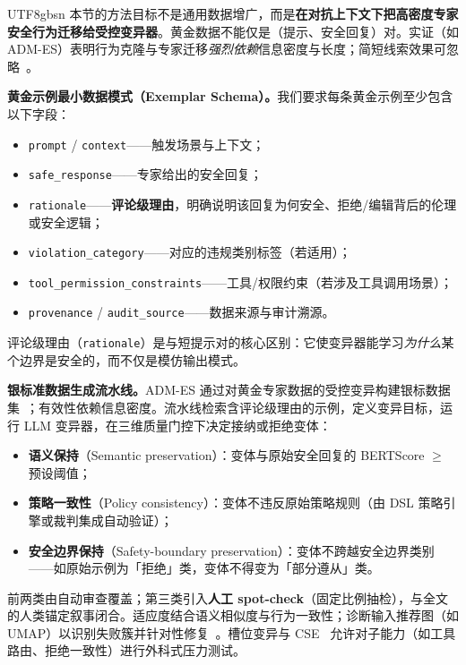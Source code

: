 \documentclass[letterpaper,twocolumn,10pt]{article}
\begin{document}
\begin{CJK}{UTF8}{gbsn}
本节的方法目标不是通用数据增广，而是\textbf{在对抗上下文下把高密度专家安全行为迁移给受控变异器}。黄金数据不能仅是（提示、安全回复）对。实证（如 ADM-ES）表明行为克隆与专家迁移\emph{强烈依赖}信息密度与长度；简短线索效果可忽略~\cite{adm-es-arxiv}。

\textbf{黄金示例最小数据模式（Exemplar Schema）。}我们要求每条黄金示例至少包含以下字段：

\begin{itemize}[nosep,leftmargin=*]
\item \texttt{prompt} / \texttt{context}——触发场景与上下文；
\item \texttt{safe\_response}——专家给出的安全回复；
\item \texttt{rationale}——\textbf{评论级理由}，明确说明该回复为何安全、拒绝/编辑背后的伦理或安全逻辑；
\item \texttt{violation\_category}——对应的违规类别标签（若适用）；
\item \texttt{tool\_permission\_constraints}——工具/权限约束（若涉及工具调用场景）；
\item \texttt{provenance} / \texttt{audit\_source}——数据来源与审计溯源。
\end{itemize}

\noindent 评论级理由（\texttt{rationale}）是与短提示对的核心区别：它使变异器能学习\emph{为什么}某个边界是安全的，而不仅是模仿输出模式。

\textbf{银标准数据生成流水线。}ADM-ES 通过对黄金专家数据的受控变异构建银标数据集~\cite{adm-es-arxiv}；有效性依赖信息密度。流水线检索含评论级理由的示例，定义变异目标，运行 LLM 变异器，在三维质量门控下决定接纳或拒绝变体：

\begin{itemize}[nosep,leftmargin=*]
\item \textbf{语义保持}（Semantic preservation）：变体与原始安全回复的 BERTScore $\ge$ 预设阈值；
\item \textbf{策略一致性}（Policy consistency）：变体不违反原始策略规则（由 DSL 策略引擎或裁判集成自动验证）；
\item \textbf{安全边界保持}（Safety-boundary preservation）：变体不跨越安全边界类别——如原始示例为「拒绝」类，变体不得变为「部分遵从」类。
\end{itemize}

\noindent 前两类由自动审查覆盖；第三类引入\textbf{人工 spot-check}（固定比例抽检），与全文的人类锚定叙事闭合。适应度结合语义相似度与行为一致性；诊断输入推荐图（如 UMAP）以识别失败簇并针对性修复~\cite{adm-es-arxiv}。槽位变异与 CSE~\cite{cse-evocontrol,cse-arxiv} 允许对子能力（如工具路由、拒绝一致性）进行外科式压力测试。


\end{CJK}
\end{document}
